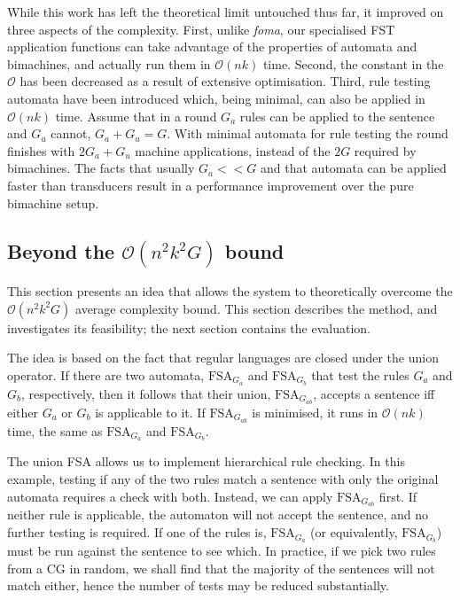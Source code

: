 \documentclass[11pt]{article}
\begin{document}
While this work has left the theoretical limit untouched thus far, it improved
on three aspects of the complexity.
First, unlike \emph{foma}, our specialised FST application functions can take
advantage of the properties of automata and bimachines, and actually run them
in $\mathcal{O}(nk)$ time.
Second, the constant in the $\mathcal{O}$ has been decreased as a result of
extensive optimisation.
Third, rule testing automata have been introduced which, being minimal,
can also be applied in $\mathcal{O}(nk)$ time. Assume that in a round $G_a$
rules can be applied to the sentence and $G_u$ cannot, $G_a + G_u = G$. With
minimal automata for rule testing the round finishes with $2G_a + G_u$ machine
applications, instead of the $2G$ required by bimachines. The facts that usually
$G_a << G$ and that automata can be applied faster than transducers result in a
performance improvement over the pure bimachine setup.


\subsection{Beyond the $\mathcal{O}(n^2k^2G)$ bound}
\label{sec:complex_idea}

This section presents an idea that allows the system to
theoretically overcome the $\mathcal{O}(n^2k^2G)$ average complexity bound.
This section describes the method, and investigates its feasibility; the
next section contains the evaluation.

The idea is based on the fact that regular languages are closed under the union
operator. If there are two automata, $\mathrm{FSA}_{G_a}$ and $\mathrm{FSA}_{G_b}$ that test the
rules $G_a$ and $G_b$, respectively, then it follows that their union,
$\mathrm{FSA}_{G_{ab}}$, accepts a sentence iff either $G_a$ or $G_b$ is applicable to it.
If $\mathrm{FSA}_{G_{ab}}$ is minimised, it runs in $\mathcal{O}(nk)$ time, the same as
$\mathrm{FSA}_{G_a}$ and $\mathrm{FSA}_{G_b}$.

The union FSA allows us to implement hierarchical rule checking. In this example,
testing if any of the two rules match a sentence with only the original
automata requires a check with both. Instead, we can apply $\mathrm{FSA}_{G_{ab}}$ first.
If neither rule is applicable, the automaton will not accept the sentence, and
no further testing is required. If one of the rules is, $\mathrm{FSA}_{G_a}$ (or
equivalently, $\mathrm{FSA}_{G_b}$) must be run against the sentence to see which. In
practice, if we pick two rules from a CG in random, we shall find that the
majority of the sentences will not match either, hence the number of tests may
be reduced substantially.
\end{document}
